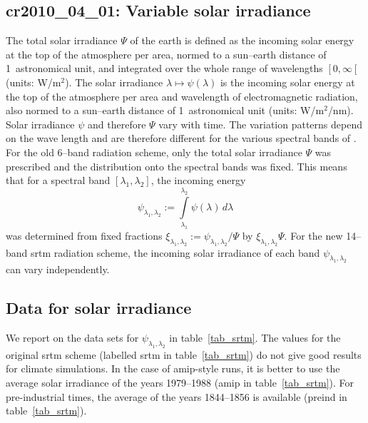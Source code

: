 \begin{appendix}
\clearpage\newpage
\section{cr2010\_04\_01: Variable solar irradiance}\label{cr20100401}

The total solar irradiance $\Psi$ of the earth is defined as the incoming
solar energy at the top of the atmosphere per area, normed to a
sun--earth distance of 1~astronomical unit, and integrated over the
whole range of wavelengths $\left[0,\infty\left[\right.\right.$
(units: W/m$^2$).
The solar irradiance $\lambda\mapsto\psi(\lambda)$ is the incoming
solar energy at the top of the 
atmosphere per area and wavelength of electromagnetic radiation, also
normed to a sun--earth distance of 1~astronomical unit (units: W/m$^2$/nm). 
Solar irradiance $\psi$ and therefore $\Psi$ vary with time. The
variation patterns depend on 
the wave length and are therefore different for the various spectral
bands of \echam. For the old 6--band radiation scheme, only the total
solar irradiance $\Psi$ was prescribed and the distribution onto the spectral
bands was fixed. This means that for a spectral band
$[\lambda_1,\lambda_2]$, the incoming energy
\begin{displaymath}
\psi_{\lambda_1,\lambda_2}:=\int\limits_{\lambda_1}^{\lambda_2}\psi(\lambda)\,d\lambda
\end{displaymath} 
was determined from fixed fractions
$\xi_{\lambda_1,\lambda_2}:=\psi_{\lambda_1,\lambda_2}/\Psi$ 
by $\xi_{\lambda_1,\lambda_2}\Psi$. For the new 14--band srtm
radiation scheme, the incoming solar irradiance of each band
$\psi_{\lambda_1,\lambda_2}$ can vary independently. 

\subsection{Data for solar irradiance}

We report on the data sets for $\psi_{\lambda_1,\lambda_2}$ in
table~\ref{tab_srtm}. The 
values for the original srtm scheme (labelled srtm in table~\ref{tab_srtm})
do not give good results for climate
simulations. In the case of amip-style runs, it is better to use
the average solar irradiance of the years 1979--1988 (amip in
table~\ref{tab_srtm}). For 
pre-industrial times, the average of the years 1844--1856 is available
(preind in table~\ref{tab_srtm}). 



\end{appendix}
